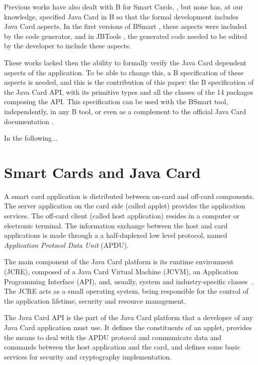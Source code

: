 \documentclass{entcs}
\begin{document}
Previous works have also dealt with B for Smart Cards,
\cite{Bert:2003,JBtools,tatibouet:lncs,requetBtoC}, but none has, at
our knowledge, specified Java Card in B so that the formal development
includes Java Card aspects. In the first versions of BSmart
\cite{Gomes10}, these aspects were included by the code generator, and
in JBTools \cite{JBtools}, the generated code needed to be edited by
the developer to include these aspects.

These works lacked then the ability to formally verify the Java Card
dependent aspects of the application. To be able to change this, a B
specification of these aspects is needed, and this is the contribution
of this paper: the B specification of the Java Card API, with its
primitive types and all the classes of the 14 packages composing the
API. This specification can be used with the BSmart tool, 
independently, in any B tool, or even as a complement to the official
Java Card documentation \cite{oracle}.

In the following...

\section{Smart Cards and Java Card}\label{sec:javacard}

A smart card application is distributed between on-card and off-card
components.  The server application on the card side (called applet)
provides the application services. The off-card client (called host
application) resides in a computer or electronic terminal. The information 
exchange between the host and card applications is
made through a a half-duplexed low level protocol, named
\emph{Application Protocol Data Unit} (APDU).  

The main component of the Java Card platform
is its runtime environment (JCRE), composed of a Java Card Virtual
Machine (JCVM), an Application Programming Interface (API), and, usually, system and
industry-specific classes~\cite{chen:2000}. The JCRE acts as a small
operating system, being responsible for the control of the application
lifetime, security and resource management.

The Java Card API is the part of the Java Card platform that a developer of any Java Card application must use. It defines the constituents of an applet, provides the means to deal with the APDU protocol and communicate data and commands between the host application and the card, and defines some basic services for security and cryptography implementation. 
\end{document}
